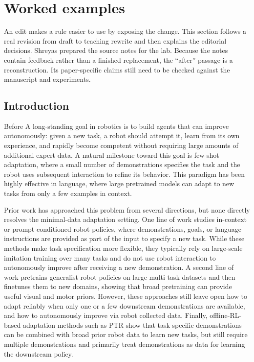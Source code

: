 \section{Worked examples}
\label{sec:worked-examples}

An edit makes a rule easier to use by exposing the change. This section follows
a real revision from draft to teaching rewrite and then explains the editorial
decisions. Shreyas prepared the source notes for the lab. Because the notes
contain feedback rather than a finished replacement, the ``after'' passage is
a reconstruction. Its paper-specific claims still need to be checked against
the manuscript and experiments.

\subsection{Introduction}

\begin{AIbox}[breakable]{Before}
A long-standing goal in robotics is to build agents that can improve
autonomously: given a new task, a robot should attempt it, learn from its own
experience, and rapidly become competent without requiring large amounts of
additional expert data. A natural milestone toward this goal is few-shot
adaptation, where a small number of demonstrations specifies the task and the
robot uses subsequent interaction to refine its behavior. This paradigm has
been highly effective in language, where large pretrained models can adapt to
new tasks from only a few examples in context.

Prior work has approached this problem from several directions, but none
directly resolves the minimal-data adaptation setting. One line of work studies
in-context or prompt-conditioned robot policies, where demonstrations, goals,
or language instructions are provided as part of the input to specify a new
task. While these methods make task specification more flexible, they typically
rely on large-scale imitation training over many tasks and do not use robot
interaction to autonomously improve after receiving a new demonstration. A
second line of work pretrains generalist robot policies on large multi-task
datasets and then finetunes them to new domains, showing that broad pretraining
can provide useful visual and motor priors. However, these approaches still
leave open how to adapt reliably when only one or a few downstream
demonstrations are available, and how to autonomously improve via
robot collected data. Finally, offline-RL-based adaptation methods such as PTR
show that task-specific demonstrations can be combined with broad prior robot
data to learn new tasks, but still require multiple demonstrations and
primarily treat demonstrations as data for learning the downstream policy.
\end{AIbox}

